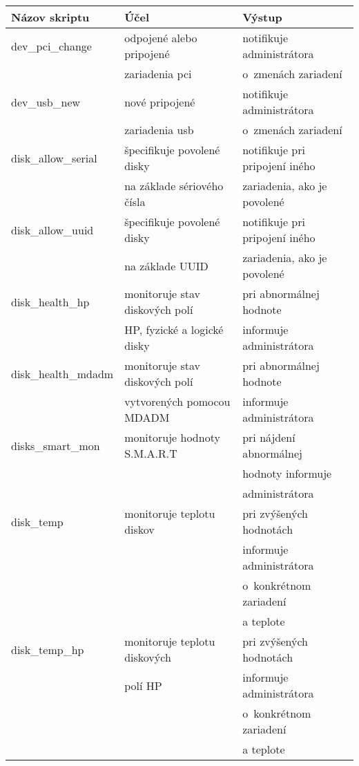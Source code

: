 \begin{tabular}{ | l | l | l | }
	\hline
	Názov skriptu & Účel & Výstup \\ \hline
	{dev\_pci\_change} & odpojené alebo pripojené & notifikuje administrátora\\
	& zariadenia pci & o~zmenách zariadení \\ \hline
	
	{dev\_usb\_new} & nové pripojené & notifikuje administrátora\\
	& zariadenia usb & o~zmenách zariadení \\ \hline
	
	{disk\_allow\_serial} & špecifikuje povolené disky & notifikuje pri pripojení iného\\
	& na základe sériového čísla & zariadenia, ako je povolené \\ \hline
	
	{disk\_allow\_uuid} & špecifikuje povolené disky & notifikuje pri pripojení iného\\
	& na základe UUID & zariadenia, ako je povolené \\ \hline
	
	{disk\_health\_hp} & monitoruje stav diskových polí & pri abnormálnej hodnote\\
	& HP, fyzické a logické disky & informuje administrátora \\ \hline
	
	{disk\_health\_mdadm} & monitoruje stav diskových polí & pri abnormálnej hodnote\\ 
	& vytvorených pomocou MDADM & informuje administrátora \\
	\hline
	
	{disks\_smart\_mon} & {monitoruje hodnoty S.M.A.R.T} & pri nájdení abnormálnej\\ 
	& & hodnoty informuje \\
	& & administrátora \\ \hline
	
	{disk\_temp} & {monitoruje teplotu diskov}  & pri zvýšených hodnotách \\
	&  & informuje administrátora\\
	& & o~konkrétnom zariadení \\
	&&a teplote  \\ \hline
	
	{disk\_temp\_hp} & {monitoruje teplotu diskových }  & pri zvýšených hodnotách \\
	& {polí HP}  & informuje administrátora\\
	& & o~konkrétnom zariadení \\
	&&a teplote  \\ \hline
	

\end{tabular}
